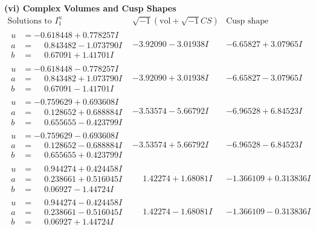 \documentclass[1p]{elsarticle_modified}
\theoremstyle{definition}
\newcommand{\I}{\sqrt{-1}}
\begin{document}
\newpage\flushleft \textbf{(vi) Complex Volumes and Cusp Shapes}
$$\begin{array}{c|c|c}  
\text{Solutions to }I^u_{1}& \I (\text{vol} + \sqrt{-1}CS) & \text{Cusp shape}\\
 \hline 
\begin{aligned}
u &= -0.618448 + 0.778257 I \\
a &= \phantom{-}0.843482 - 1.073790 I \\
b &= \phantom{-}0.67091 + 1.41701 I\end{aligned}
 & -3.92090 - 3.01938 I & -6.65827 + 3.07965 I \\ \hline\begin{aligned}
u &= -0.618448 - 0.778257 I \\
a &= \phantom{-}0.843482 + 1.073790 I \\
b &= \phantom{-}0.67091 - 1.41701 I\end{aligned}
 & -3.92090 + 3.01938 I & -6.65827 - 3.07965 I \\ \hline\begin{aligned}
u &= -0.759629 + 0.693608 I \\
a &= \phantom{-}0.128652 + 0.688884 I \\
b &= \phantom{-}0.655655 - 0.423799 I\end{aligned}
 & -3.53574 - 5.66792 I & -6.96528 + 6.84523 I \\ \hline\begin{aligned}
u &= -0.759629 - 0.693608 I \\
a &= \phantom{-}0.128652 - 0.688884 I \\
b &= \phantom{-}0.655655 + 0.423799 I\end{aligned}
 & -3.53574 + 5.66792 I & -6.96528 - 6.84523 I \\ \hline\begin{aligned}
u &= \phantom{-}0.944274 + 0.424458 I \\
a &= \phantom{-}0.238661 + 0.516045 I \\
b &= \phantom{-}0.06927 - 1.44724 I\end{aligned}
 & \phantom{-}1.42274 + 1.68081 I & -1.366109 + 0.313836 I \\ \hline\begin{aligned}
u &= \phantom{-}0.944274 - 0.424458 I \\
a &= \phantom{-}0.238661 - 0.516045 I \\
b &= \phantom{-}0.06927 + 1.44724 I\end{aligned}
 & \phantom{-}1.42274 - 1.68081 I & -1.366109 - 0.313836 I \\ \hline\begin{aligned}

\end{aligned}
\end{array}$$
\end{document}
